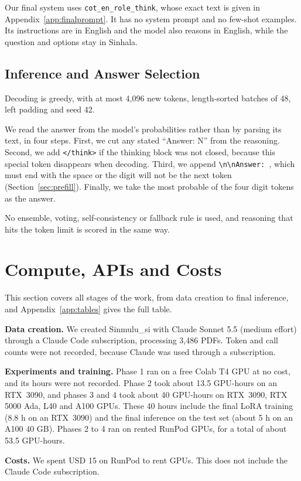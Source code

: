 \documentclass[11pt]{article}
\newcommand{\cond}[1]{\texttt{#1}}
\newcommand{\para}[1]{\smallskip\noindent\textbf{#1}\enspace}
\newcommand{\sinmulu}{Sinmulu\_si}
\begin{document}
Our final system uses \cond{cot\_en\_role\_think}, whose exact text is given in Appendix~\ref{app:finalprompt}. It has no system prompt and no few-shot examples. Its instructions are in English and the model also reasons in English, while the question and options stay in Sinhala.

\subsection{Inference and Answer Selection}
Decoding is greedy, with at most 4,096 new tokens, length-sorted batches of 48, left padding and seed 42.

We read the answer from the model's probabilities rather than by parsing its text, in four steps. First, we cut any stated ``Answer: N'' from the reasoning. Second, we add \texttt{</think>} if the thinking block was not closed, because this special token disappears when decoding. Third, we append \verb|\n\nAnswer: |, which must end with the space or the digit will not be the next token (Section~\ref{sec:prefill}). Finally, we take the most probable of the four digit tokens as the answer.

No ensemble, voting, self-consistency or fallback rule is used, and reasoning that hits the token limit is scored in the same way.

\section{Compute, APIs and Costs}\label{sec:compute}
This section covers all stages of the work, from data creation to final inference, and Appendix~\ref{app:tables} gives the full table.

\para{Data creation.} We created \sinmulu{} with Claude Sonnet 5.5 (medium effort) through a Claude Code subscription, processing 3,486 PDFs. Token and call counts were not recorded, because Claude was used through a subscription.

\para{Experiments and training.} Phase 1 ran on a free Colab T4 GPU at no cost, and its hours were not recorded. Phase 2 took about 13.5 GPU-hours on an RTX~3090, and phases 3 and 4 took about 40 GPU-hours on RTX~3090, RTX 5000 Ada, L40 and A100 GPUs. These 40 hours include the final LoRA training (8.8 h on an RTX~3090) and the final inference on the test set (about 5 h on an A100 40 GB). Phases 2 to 4 ran on rented RunPod GPUs, for a total of about 53.5 GPU-hours.

\para{Costs.} We spent USD 15 on RunPod to rent GPUs. This does not include the Claude Code subscription.
\end{document}
